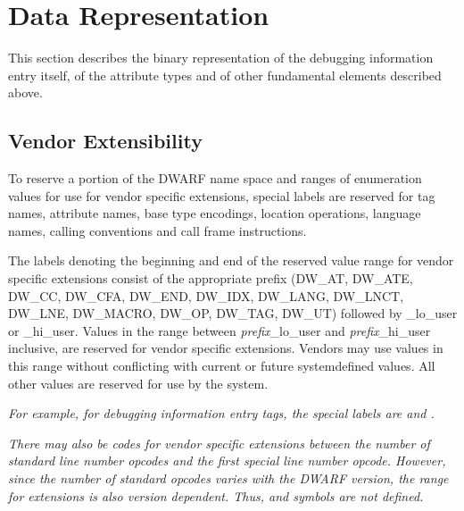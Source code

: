 \chapter{Data Representation}
\label{datarep:datarepresentation}

This section describes the binary representation of the
debugging information entry itself, of the attribute types
and of other fundamental elements described above.

\section{Vendor Extensibility}
\label{datarep:vendorextensibility}

To 
reserve a portion of the DWARF name space and ranges of
enumeration values for use for vendor specific extensions,
special labels are reserved for tag names, attribute names,
base type encodings, location operations, language names,
calling conventions and call frame instructions.

The labels denoting the beginning and end of the 
\hypertarget{chap:DWXXXlohiuser}{reserved value range}
for vendor specific extensions consist of the
appropriate prefix 
(\DWATlouserMARK{}\DWAThiuserMARK{}DW\_AT, 
\DWATElouserMARK{}\DWATEhiuserMARK{}DW\_ATE, 
\DWCClouserMARK{}\DWCChiuserMARK{}DW\_CC, 
\DWCFAlouserMARK{}\DWCFAhiuserMARK{}DW\_CFA, 
\DWENDlouserMARK{}\DWENDhiuserMARK{}DW\_END, 
\DWIDXlouserMARK{}\DWIDXhiuserMARK{}DW\_IDX, 
\DWLANGlouserMARK{}\DWLANGhiuserMARK{}DW\_LANG, 
\DWLNCTlouserMARK{}\DWLNCThiuserMARK{}DW\_LNCT, 
\DWLNElouserMARK{}\DWLNEhiuserMARK{}DW\_LNE, 
\DWMACROlouserMARK{}\DWMACROhiuserMARK{}DW\_MACRO,
\bb 
\DWOPlouserMARK{}\DWOPhiuserMARK{}DW\_OP,
\DWTAGlouserMARK{}\DWTAGhiuserMARK{}DW\_TAG,
\DWUTlouserMARK{}\DWUThiuserMARK{}DW\_UT)
\eb 
followed by \_lo\_user or \_hi\_user. 
Values in the  range between \textit{prefix}\_lo\_user 
and \textit{prefix}\_hi\_user inclusive,
are reserved for vendor specific extensions. Vendors may
use values in this range without conflicting with current or
future system\dash defined values. All other values are reserved
for use by the system.

\textit{For example, for debugging information entry
tags, the special labels are \DWTAGlouserNAME{} and \DWTAGhiuserNAME.}

\textit{There may also be codes for vendor specific extensions
between the number of standard line number opcodes and
the first special line number opcode. However, since the
number of standard opcodes varies with the DWARF version,
the range for extensions is also version dependent. Thus,
\DWLNSlouserTARG{} and 
\DWLNShiuserTARG{} symbols are not defined.}

